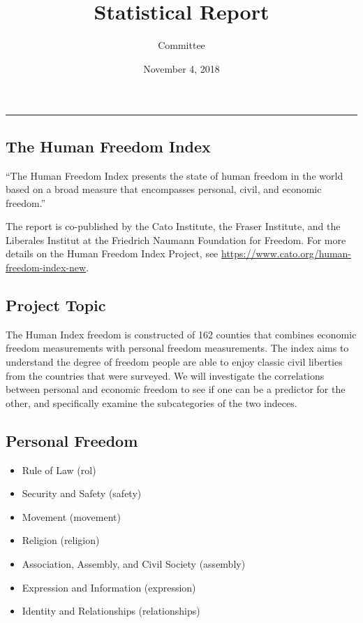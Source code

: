 \documentclass[]{article}
\title{Statistical Report}
\author{Committee}
\date{November 4, 2018}
\providecommand{\tightlist}{%
  \setlength{\itemsep}{0pt}\setlength{\parskip}{0pt}}
\begin{document}
\maketitle

{
\setcounter{tocdepth}{2}
\tableofcontents
}
\begin{center}\rule{0.5\linewidth}{\linethickness}\end{center}

\hypertarget{the-human-freedom-index}{%
\subsection{The Human Freedom Index}\label{the-human-freedom-index}}

``The Human Freedom Index presents the state of human freedom in the
world based on a broad measure that encompasses personal, civil, and
economic freedom.''

The report is co-published by the Cato Institute, the Fraser Institute,
and the Liberales Institut at the Friedrich Naumann Foundation for
Freedom. For more details on the Human Freedom Index Project, see
\url{https://www.cato.org/human-freedom-index-new}.

\hypertarget{project-topic}{%
\subsection{Project Topic}\label{project-topic}}

The Human Index freedom is constructed of 162 counties that combines
economic freedom measurements with personal freedom measurements. The
index aims to understand the degree of freedom people are able to enjoy
classic civil liberties from the countries that were surveyed. We will
investigate the correlations between personal and economic freedom to
see if one can be a predictor for the other, and specifically examine
the subcategories of the two indeces.

\hypertarget{personal-freedom}{%
\subsection{Personal Freedom}\label{personal-freedom}}

\begin{itemize}
\tightlist
\item
  Rule of Law (rol)
\item
  Security and Safety (safety)
\item
  Movement (movement)
\item
  Religion (religion)
\item
  Association, Assembly, and Civil Society (assembly)
\item
  Expression and Information (expression)
\item
  Identity and Relationships (relationships)
\end{itemize}
\end{document}
